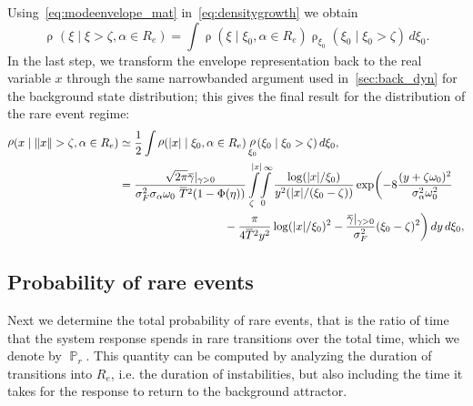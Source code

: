 \documentclass[3p]{elsarticle}
\newcommand{\overbar}[1]{\mkern 1mu\overline{\mkern-1mu#1\mkern-1mu}\mkern 1mu}
\DeclarePairedDelimiter\abs{\lvert}{\rvert}
\DeclareMathOperator{\prob}{\mathbb P}
\DeclareMathOperator{\pdf}{\rho}
\begin{document}
Using~\cref{eq:modeenvelope_mat} in~\cref{eq:densitygrowth} we obtain
\begin{equation}
\pdf_{}(\xi \mid \xi>\zeta, \alpha \in R_e) = \int \pdf(  \xi\mid  \xi_0, \alpha \in R_e)  \pdf_{\xi_0}(\xi_0\mid\xi_0 > \zeta)\,d\xi_0 .
\end{equation}
In the last step, we transform the envelope representation  back to the real variable $x$ through the same   narrowbanded argument used in~\cref{sec:back_dyn} for the  background state distribution; this gives the final result for the distribution of the rare event regime:
\begin{align}\label{eq:ouunstabregime}
 \pdf_{}(x \mid \left\Vert x\right\Vert>\zeta,\alpha \in R_e) &\simeq   \frac{1}{2} \int \pdf(\left\vert  x\right\vert\mid  \xi_0,
\alpha \in R_e)  \pdf_{\xi_0}(\xi_0\mid\xi_0 > \zeta)\,d\xi_0 ,\\
          &\begin{multlined}=  \frac{ \sqrt{ 2 \pi} \overbar\gamma|_{\gamma>0} }{\sigma_F^2 \sigma_{\alpha}\omega_0\ \overbar  T^2 (1-\Phi(\eta))   }  \int\limits_\zeta^{\abs{x}}\!\int\limits_0^\infty \frac{\log(\abs{x}/\xi_0)}{y^2(\abs{x}/(\xi_0-\zeta))} \exp\biggl(-8\frac{(y + \zeta \omega_0)^2}{ \sigma_{\alpha}^2\omega_0^2}  \\- \frac{\pi}{4 \overbar T^2 y^2 } \log(\abs{x}/\xi_0)^2 - \frac{\overbar\gamma|_{\gamma>0}}{\sigma_F^2} (\xi_0-\zeta)^2 \bigg) \,dy\,d\xi_0,\end{multlined}\nonumber
\end{align}
 



\subsection{Probability of rare events}

Next we determine   the total probability of rare events, that is the ratio of time that the system response spends in rare transitions over the   total time, which we denote by  $\prob_r$. This quantity can be computed by analyzing the    duration of transitions into $R_e$, i.e. the duration of instabilities, but also including the time it takes for the response to return to the background attractor.
\end{document}
